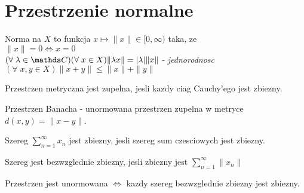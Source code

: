 \section{Przestrzenie normalne}

\begin{multicols*}{2}
    
    {\color{def}Norma} na $X$ to funkcja $x\mapsto \|x\|\in[0, \infty)$ taka, ze\smallskip\\
        \point $\|x\|=0\iff x=0$\smallskip\\
        \point $(\forall\;\lambda\in\C)(\forall\;x\in X) \|\lambda x\|=|\lambda|\|x\|$ - \emph{jednorodnosc}\smallskip\\
        \point $(\forall\;x,y\in X)\| x+y\|\leq \|x\|+\|y\|$
    \bigskip

    Przestrzen metryczna jest {\color{def}zupelna}, jesli kazdy ciag Cauchy'ego jest zbiezny.
    \medskip

    {\color{def}Przestrzen Banacha} - unormowana przestrzen zupelna w metryce $d(x, y)=\|x-y\|$.
    \bigskip

    \pdef

    Szereg $\sum\limits_{n=1}^\infty x_n$ jest {\color{acc}zbiezny}, jesli szereg sum czesciowych jest zbiezny.\\

    \kdef

    Szereg jest {\color{acc}bezwzglednie zbiezny}, jesli zbiezny jest $\sum\limits_{n=1}^\infty\|x_n\|$
    \medskip

    \pdef
    
    Przestrzen jest unormowana $\iff$ kazdy szereg bezwzglednie zbiezny jest zbiezny.


    \kdef

\end{multicols*}